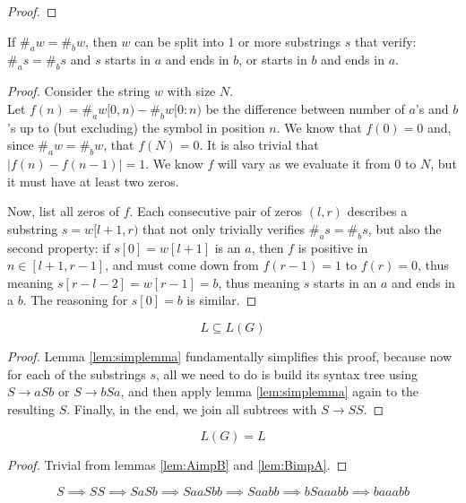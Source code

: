\documentclass[docid=TP08]{tcom_TP}
\begin{document}
{\begin{proof}
\end{proof}
\begin{lemma} \label{lem:simplemma}
If $\#_aw=\#_bw$, then $w$ can be split into 1 or more substrings $s$ that verify: $\#_as=\#_bs$ and $s$ starts in $a$ and ends in $b$, or starts in $b$ and ends in $a$.
\end{lemma}
\begin{proof}
Consider the string $w$ with size $N$.\\
Let $f(n)=\#_aw[0,n)-\#_bw[0:n)$ be the difference between number of $a$'s and $b$'s up to (but excluding) the symbol in position $n$. We know that $f(0)=0$ and, since $\#_aw=\#_bw$, that $f(N)=0$. It is also trivial that $|f(n)-f(n-1)| = 1$. We know $f$ will vary as we evaluate it from $0$ to $N$, but it must have at least two zeros.\par
Now, list all zeros of $f$. Each consecutive pair of zeros $(l,r)$ describes a substring $s=w[l+1,r)$ that not only trivially verifies $\#_as=\#_bs$, but also the second property: if $s[0] = w[l+1]$ is an $a$, then $f$ is positive in $n \in [l+1,r-1]$, and must come down from $f(r-1)=1$ to $f(r)=0$, thus meaning $s[r-l-2]=w[r-1]=b$, thus meaning $s$ starts in an $a$ and ends in a $b$. The reasoning for $s[0]=b$ is similar.
\end{proof}
\begin{lemma} \label{lem:BimpA}
\begin{equation*}
	L \subseteq L(G)
\end{equation*}
\end{lemma}
\begin{proof}
Lemma \ref{lem:simplemma} fundamentally simplifies this proof, because now for each of the substrings $s$, all we need to do is build its syntax tree using $S \rightarrow aSb$ or $S \rightarrow bSa$, and then apply lemma \ref{lem:simplemma} again to the resulting $S$. Finally, in the end, we join all subtrees with $S \rightarrow SS$. 
\end{proof}
\begin{theorem}
\begin{equation*}
	L(G) = L
\end{equation*}
\end{theorem}
\begin{proof}
Trivial from lemmas \ref{lem:AimpB} and \ref{lem:BimpA}.
\end{proof}
\begin{equation*}
	S \implies SS \implies SaSb \implies SaaSbb \implies Saabb \implies bSaaabb \implies baaabb

\end{equation*}}
\end{document}

